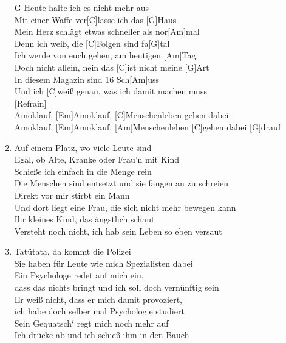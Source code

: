 \def\Titel{Amoklauf}
\def\Interpret{Mono für Alle!}
\def\Referenz{}

\LiedSetup{}

\begin{guitarMagic}
    \begin{enumerate}
        \item   [G]Heute halte ich es nicht mehr aus\\
            [Am] Mit einer Waffe ver[C]lasse ich das [G]Haus\\
            Mein Herz schlägt etwas schneller als nor[Am]mal\\
            Denn ich weiß, die [C]Folgen sind fa[G]tal\\
            Ich werde von euch gehen, am heutigen [Am]Tag\\
            Doch nicht allein, nein das [C]ist nicht meine [G]Art\\
            In diesem Magazin sind 16 Sch[Am]uss\\
            Und ich [C]weiß genau, was ich damit machen muss\\

            [Refrain]\\
            [G]Amoklauf, [Em]Amoklauf, [C]Menschenleben gehen dabei-\\
            [G]Amoklauf, [Em]Amoklauf, [Am]Menschenleben [C]gehen dabei [G]drauf\\

            \liedweiter
        \item Auf einem Platz, wo viele Leute sind\\
            Egal, ob Alte, Kranke oder Frau’n mit Kind\\
            Schieße ich einfach in die Menge rein\\
            Die Menschen sind entsetzt und sie fangen an zu schreien\\
            Direkt vor mir stirbt ein Mann\\
            Und dort liegt eine Frau, die sich nicht mehr bewegen kann\\
            Ihr kleines Kind, das ängstlich schaut\\
            Versteht noch nicht, ich hab sein Leben so eben versaut\\

        \item Tatütata, da kommt die Polizei\\
            Sie haben für Leute wie mich Spezialisten dabei\\
            Ein Psychologe redet auf mich ein,\\
            dass das nichts bringt und ich soll doch vernünftig sein\\
            Er weiß nicht, dass er mich damit provoziert,\\
            ich habe doch selber mal Psychologie studiert\\
            Sein Gequatsch‘ regt mich noch mehr auf\\
            Ich drücke ab und ich schieß ihm in den Bauch\\


\end{enumerate}
\end{guitarMagic}
